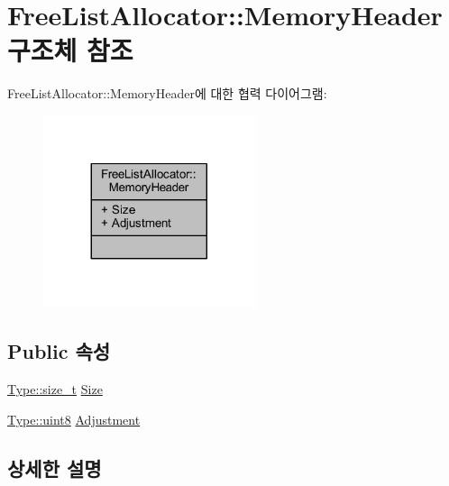 \hypertarget{struct_comet_engine_1_1_core_1_1_memory_1_1_free_list_allocator_1_1_memory_header}{}\section{Free\+List\+Allocator\+:\+:Memory\+Header 구조체 참조}
\label{struct_comet_engine_1_1_core_1_1_memory_1_1_free_list_allocator_1_1_memory_header}


Free\+List\+Allocator\+:\+:Memory\+Header에 대한 협력 다이어그램\+:\nopagebreak
\begin{figure}[H]
\begin{center}
\leavevmode
\includegraphics[width=176pt]{struct_comet_engine_1_1_core_1_1_memory_1_1_free_list_allocator_1_1_memory_header__coll__graph}
\end{center}
\end{figure}
\subsection*{Public 속성}
\begin{DoxyCompactItemize}
\item 
\hyperlink{namespace_comet_engine_1_1_type_a7c94ea6f8948649f8d181ae55911eeaf}{Type\+::size\+\_\+t} \hyperlink{struct_comet_engine_1_1_core_1_1_memory_1_1_free_list_allocator_1_1_memory_header_ae6cf85bdf7b52a990d4428449e599c8e}{Size}
\item 
\hyperlink{namespace_comet_engine_1_1_type_a1b09856a6463f2bcc4bd8ff0e4e3ee0f}{Type\+::uint8} \hyperlink{struct_comet_engine_1_1_core_1_1_memory_1_1_free_list_allocator_1_1_memory_header_ad3a03b9a927b866d54e19f7558846c6a}{Adjustment}
\end{DoxyCompactItemize}


\subsection{상세한 설명}


